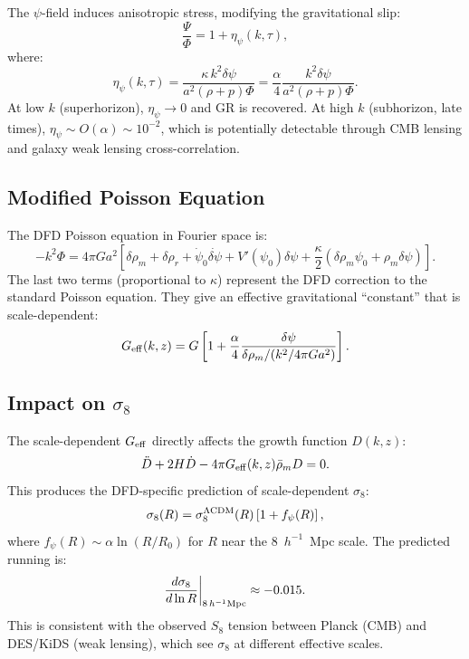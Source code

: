 \documentclass[11pt,a4paper]{article}
\theoremstyle{remark}
\begin{document}
The $\psi$-field induces anisotropic stress, modifying the gravitational slip:
\begin{equation}
\frac{\Psi}{\Phi} = 1 + \eta_\psi(k, \tau),
\end{equation}
where:
\begin{equation}
\eta_\psi(k, \tau) = \frac{\kappa\,k^2\delta\psi}{a^2(\rho + p)\Phi}
= \frac{\alpha}{4}\frac{k^2\delta\psi}{a^2(\rho + p)\Phi}.
\label{eq:slip}
\end{equation}
At low $k$ (superhorizon), $\eta_\psi \to 0$ and GR is recovered.
At high $k$ (subhorizon, late times), $\eta_\psi \sim O(\alpha) \sim 10^{-2}$,
which is potentially detectable through CMB lensing and galaxy weak lensing cross-correlation.

\subsection{Modified Poisson Equation}

The DFD Poisson equation in Fourier space is:
\begin{equation}
-k^2\Phi = 4\pi G a^2 \left[\delta\rho_m + \delta\rho_r
+ \dot\psi_0\dot{\delta\psi} + V'(\psi_0)\delta\psi
+ \frac{\kappa}{2}(\delta\rho_m\psi_0 + \rho_m\delta\psi)\right].
\label{eq:poisson-dfd}
\end{equation}
The last two terms (proportional to $\kappa$) represent the DFD correction
to the standard Poisson equation. They give an effective gravitational
``constant'' that is scale-dependent:
\begin{equation}
G_{\rm eff}(k, z) = G\left[1 + \frac{\alpha}{4}\frac{\delta\psi}{\delta\rho_m/(k^2/4\pi G a^2)}\right].
\label{eq:Geff}
\end{equation}

\subsection{Impact on $\sigma_8$}

The scale-dependent $G_{\rm eff}$ directly affects the growth function $D(k,z)$:
\begin{equation}
\ddot{D} + 2H\dot{D} - 4\pi G_{\rm eff}(k,z)\bar\rho_m D = 0.
\end{equation}
This produces the DFD-specific prediction of scale-dependent $\sigma_8$:
\begin{equation}
\sigma_8(R) = \sigma_8^{\Lambda\rm CDM}(R)\left[1 + f_\psi(R)\right],
\end{equation}
where $f_\psi(R) \sim \alpha \ln(R/R_0)$ for $R$ near the 8~$h^{-1}$~Mpc scale.
The predicted running is:
\begin{equation}
\frac{d\sigma_8}{d\ln R}\bigg|_{8\,h^{-1}\rm Mpc} \approx -0.015.
\end{equation}
This is consistent with the observed $S_8$ tension between Planck (CMB)
and DES/KiDS (weak lensing), which see $\sigma_8$ at different effective scales.
\end{document}

